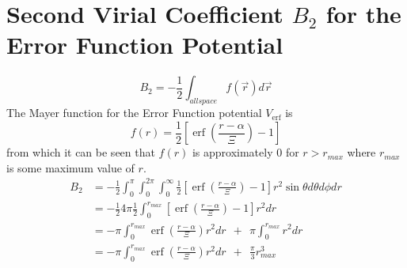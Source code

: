 \documentclass[double,12pt]{beavtex}
\begin{document}
\section{Second Virial Coefficient $B_{2}$ for the Error Function Potential}
\begin{equation}B_2=-\frac{1}{2}\int_{allspace}f(\vec{r})d\vec r\end{equation}
The Mayer function for the Error Function potential $V_{\operatorname{erf}}$ is
\begin{equation}f(r)=\frac{1}{2}\left[\operatorname{erf}\left(\frac{r-\alpha}{\Xi}\right)-1\right]\end{equation} 
from which it can be seen that $f(r)$ is approximately 0 for $r>r_{max}$ 
where $r_{max}$ is some maximum value of $r$.
\begin{align}
 B_2 &= -\frac{1}{2}\int_0^{\pi}\int_0^{2\pi}\int_0^\infty\frac{1}{2}\left[\operatorname{erf}\left(\frac{r-\alpha}{\Xi}\right)-1\right]r^2\sin{\theta}d{\theta}d{\phi}dr \\
     &= -\frac{1}{2}4\pi\frac{1}{2}\int_{0}^{r_{max}}\left[\operatorname{erf}\left(\frac{r-\alpha}{\Xi}\right)-1\right]r^2dr \\
     &= -\pi\int_{0}^{r_{max}}\operatorname{erf}\left(\frac{r-\alpha}{\Xi}\right)r^2dr {~~}+{~~} \pi\int_0^{r_{max}}r^2dr   \\
     &= -\pi\int_{0}^{r_{max}}\operatorname{erf}\left(\frac{r-\alpha}{\Xi}\right)r^2dr {~~}+{~~} \frac{\pi}{3}r_{max}^3   
\end{align}
\end{document}
